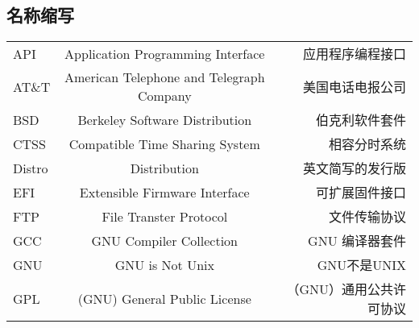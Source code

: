 

\begin{landscape}
{
\renewcommand{\clearpage}{}
\renewcommand{\newpage}{}
\chapter{名称缩写}
}


\begin{center}






\begin{supertabular}{l|c|r}
API & Application Programming Interface & 应用程序编程接口 \\
AT\&T & American Telephone and Telegraph Company & 美国电话电报公司\\
BSD & Berkeley Software Distribution & 伯克利软件套件 \\
CTSS & Compatible Time Sharing System & 相容分时系统 \\
Distro & Distribution & 英文简写的发行版 \\
EFI & Extensible Firmware Interface & 可扩展固件接口 \\
FTP & File Transter Protocol & 文件传输协议 \\
GCC & GNU Compiler Collection & GNU 编译器套件 \\
GNU & GNU is Not Unix & GNU不是UNIX \\
GPL & (GNU) General Public License & （GNU）通用公共许可协议 \\


\end{supertabular}
\end{center}
\end{landscape}
